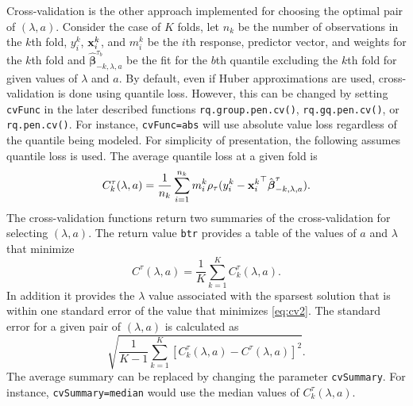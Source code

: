 Cross-validation is the other approach implemented for choosing the optimal pair of \((\lambda,a)\). Consider the case of \(K\) folds, let \(n_k\) be the number of observations in the \(k\)th fold, \(y_i^k\), \({\bf x}_i^k\), and \(m_i^k\) be the \(i\)th response, predictor vector, and weights for the \(k\)th fold and \(\hat{\boldsymbol \beta}^{\tau_b}_{-k,\lambda,a}\) be the fit for the \(b\)th quantile excluding the \(k\)th fold for given values of \(\lambda\) and \(a\). By default, even if Huber approximations are used, cross-validation is done using quantile loss. However, this can be changed by setting \texttt{cvFunc} in the later described functions \texttt{rq.group.pen.cv()}, \texttt{rq.gq.pen.cv()}, or \texttt{rq.pen.cv()}. For instance, \texttt{cvFunc=abs} will use absolute value loss regardless of the quantile being modeled. For simplicity of presentation, the following assumes quantile loss is used. The average quantile loss at a given fold is
\begin{equation}
C_k^\tau(\lambda,a) = \frac{1}{n_k} \sum_{i=1}^{n_k} m_i^k \rho_\tau(y_i^k-{{\bf x}_i^k}^\top\hat{\boldsymbol \beta}^{\tau}_{-k,\lambda,a}).
\label{eq:cv1}
\end{equation}
The cross-validation functions return two summaries of the cross-validation for selecting \((\lambda,a)\). The return value \texttt{btr} provides a table of the values of \(a\) and \(\lambda\) that minimize
\begin{equation}
C^\tau(\lambda,a) = \frac{1}{K} \sum_{k=1}^K C_k^\tau(\lambda,a).
\label{eq:cv2}
\end{equation}
In addition it provides the \(\lambda\) value associated with the sparsest solution that is within one standard error of the value that minimizes \eqref{eq:cv2}. The standard error for a given pair of \((\lambda,a)\) is calculated as
\begin{equation}
\sqrt{\frac{1}{K-1} \sum_{k=1}^K \left[C_k^\tau(\lambda,a)-C^\tau(\lambda,a) \right]^2}.
\end{equation}
The average summary can be replaced by changing the parameter \texttt{cvSummary}. For instance, \texttt{cvSummary=median} would use the median values of \(C_k^\tau(\lambda,a)\).

